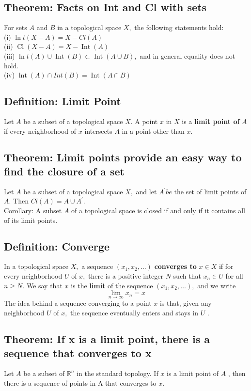 \documentclass[12pt]{article}
\begin{document}
	\subsection{Theorem: Facts on Int and Cl with sets}
		For sets $A$ and $B$ in a topological space $X ,$ the following statements hold:\\
		(i) $\ln t ( X - A ) = X - C l ( A )$\\
		(ii) $\operatorname { Cl } ( X - A ) = X - \operatorname { Int } ( A )$\\
		(iii) $\ln t ( A ) \cup \operatorname { Int } ( B ) \subset \operatorname { Int } ( A \cup B ) ,$ and in general equality does not hold.\\
		(iv) $\operatorname { lnt } ( A ) \cap Int ( B ) = \operatorname { Int } ( A \cap B )$
	\subsection{Definition: Limit Point}
		Let $A$ be a subset of a topological space $X .$ A point $x$ in
		$X$ is a \textbf{limit point of} $A$ if every neighborhood of $x$ intersects $A$ in a point other
		than $x .$
	\subsection{Theorem: Limit points provide an easy way to find the closure of a set}
		Let $ A $ be a subset of a topological space $X ,$ and let $A ^ { \prime } b e$
		the set of limit points of $A .$ Then $C l ( A ) = A \cup A ^ { \prime } .$\\
		\subitem Corollary: A subset $  A  $ of a topological space is closed if and only if
		it contains all of its limit points.
	\subsection{Definition: Converge}
		In a topological space $X ,$ a sequence $\left( x _ { 1 } , x _ { 2 } , \ldots \right)$ \textbf{converges to } $x \in X$ if for every neighborhood $U$ of $x ,$ there is a positive integer $N$ such that $x _ { n } \in U$ for all $n \geq N .$ We say that $x$ is the \textbf{limit} of the sequence $\left( x _ { 1 } , x _ { 2 } , \ldots \right) ,$ and we write
		\[\lim _ { n \rightarrow \infty } x _ { n } = x\]
		The idea behind a sequence converging to a point $x$ is that, given any
		neighborhood $U$ of $x ,$ the sequence eventually enters and stays in $U$ .
	\subsection{Theorem: If x is a limit point, there is a sequence that converges to x}
		Let $ A  $ be a subset of $\mathbb { R } ^ { n }$ in the standard topology. If $x$ is a limit point of $A$ , then there is a sequence of points in A that converges to $x .$
\end{document}
